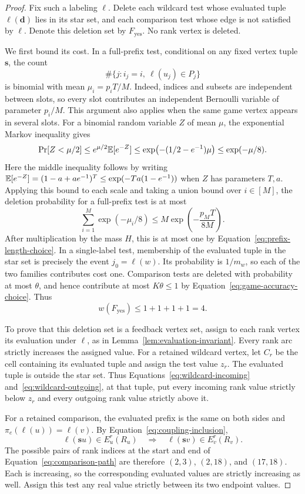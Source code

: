 \begin{proof}
Fix such a labeling $\ell$.  Delete each wildcard test whose evaluated
tuple $\ell(\mathbf d)$ lies in its star set, and each comparison test
whose edge is not satisfied by $\ell$.  Denote this deletion set by
$F_{\mathrm{yes}}$.  No rank vertex is deleted.

We first bound its cost.  In a full-prefix test, conditional on any fixed
vertex tuple $\mathbf s$, the count
\[
  \#\{j:i_j=i,\ \ell(u_j)\in P_j\}
\]
is binomial with mean $\mu_i=p_iT/M$.  Indeed, indices and subsets are
independent between slots, so every slot contributes an independent
Bernoulli variable of parameter $p_i/M$.  This argument also applies
when the same game vertex appears in several slots.  For a binomial random
variable $Z$ of mean $\mu$, the exponential Markov inequality gives
\[
  \Pr[Z<\mu/2]
  \le e^{\mu/2}\mathbb E[e^{-Z}]
  \le\exp\bigl(-(1/2-e^{-1})\mu\bigr)
  \le\exp(-\mu/8).
\]
Here the middle inequality follows by writing
$\mathbb E[e^{-Z}]=(1-a+ae^{-1})^T\le\exp(-Ta(1-e^{-1}))$
when $Z$ has parameters $T,a$.  Applying this bound to each scale and
taking a union bound over $i\in[M]$, the deletion probability for a
full-prefix test is at most
\[
  \sum_{i=1}^{M}\exp(-\mu_i/8)
  \le M\exp\left(-\frac{p_MT}{8M}\right).
\]
After multiplication by the mass $H$, this is at most one by
Equation~\eqref{eq:prefix-length-choice}.  In a single-label test, membership
of the evaluated tuple in the star set is precisely the event
$j_0=\ell(w)$.  Its probability is $1/m_w$, so each of the two families
contributes cost one.  Comparison tests are deleted with probability at
most $\theta$, and hence contribute at most $K\theta\le1$ by
Equation~\eqref{eq:game-accuracy-choice}.  Thus
\[
  w(F_{\mathrm{yes}})\le 1+1+1+1=4.
\]

To prove that this deletion set is a feedback vertex set, assign to each
rank vertex its evaluation under $\ell$, as in
Lemma~\ref{lem:evaluation-invariant}.  Every rank arc strictly increases
the assigned value.  For a retained wildcard vertex, let $C_r$ be the
cell containing its evaluated tuple and assign the test value $z_r$.
The evaluated tuple is outside the star set.  Thus
Equations~\eqref{eq:wildcard-incoming} and~\eqref{eq:wildcard-outgoing}, at that
tuple, put every incoming rank value strictly below $z_r$ and every
outgoing rank value strictly above it.

For a retained comparison, the evaluated prefix is the same on both
sides and $\pi_e(\ell(u))=\ell(v)$.  By
Equation~\eqref{eq:coupling-inclusion},
\[
  \ell(\mathbf s u)\in E_u^r(R_u)
  \quad\Longrightarrow\quad
  \ell(\mathbf s v)\in E_v^r(R_v).
\]
The possible pairs of rank indices at the start and end of
Equation~\eqref{eq:comparison-path} are therefore $(2,3)$, $(2,18)$, and
$(17,18)$.  Each is increasing, so the corresponding evaluated values are
strictly increasing as well.  Assign this test any real value strictly
between its two endpoint values.


\end{proof}
